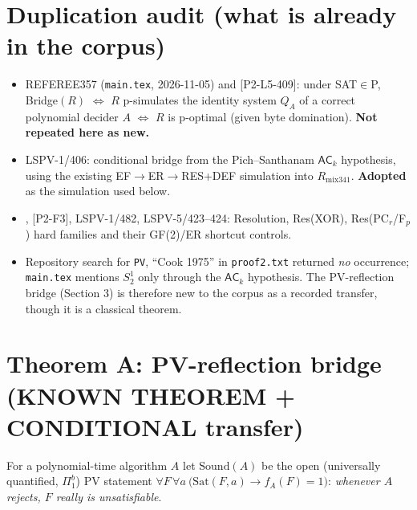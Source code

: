 \documentclass[11pt]{article}
\begin{document}
\section{Duplication audit (what is already in the corpus)}
\begin{itemize}
\item REFEREE357 (\texttt{main.tex}, 2026-11-05) and [P2-L5-409]: under
SAT$\in$P, Bridge$(R)$ $\iff$ $R$ p-simulates the identity system $Q_A$ of a
correct polynomial decider $A$ $\iff$ $R$ is p-optimal (given byte domination).
\textbf{Not repeated here as new.}
\item LSPV-1/406: conditional bridge from the Pich--Santhanam $\mathsf{AC}_k$
hypothesis, using the existing EF$\to$ER$\to$RES+DEF simulation into
$R_{\mathrm{mix341}}$. \textbf{Adopted} as the simulation used below.
\item [P2-F1], [P2-F3], LSPV-1/482, LSPV-5/423--424: Resolution, Res(XOR),
Res(PC$_r$/F$_p$) hard families and their GF(2)/ER shortcut controls.
\item Repository search for \texttt{PV}, ``Cook 1975'' in \texttt{proof2.txt}
returned \emph{no} occurrence; \texttt{main.tex} mentions $S^1_2$ only through
the $\mathsf{AC}_k$ hypothesis. The PV-reflection bridge (Section 3) is therefore
new to the corpus as a recorded transfer, though it is a classical theorem.
\end{itemize}

\section{Theorem A: PV-reflection bridge (KNOWN THEOREM + CONDITIONAL transfer)}
For a polynomial-time algorithm $A$ let $\mathrm{Sound}(A)$ be the open
(universally quantified, $\Pi^b_1$) PV statement
$\forall F\,\forall a\ \bigl(\mathrm{Sat}(F,a)\to f_A(F)=1\bigr)$:
\emph{whenever $A$ rejects, $F$ really is unsatisfiable}.
\end{document}
